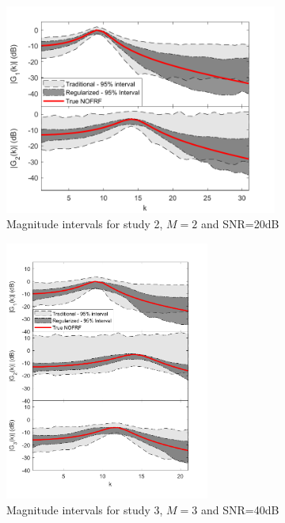 \begin{figure}[!hp]
\centering
\includegraphics[width=0.8\textwidth]{Chapter7_NOFRFs/Hamm2ndOrder_SNR10_N128_DiscreteTime.pdf}
\caption{Magnitude intervals for study 2, $M=2$ and SNR=20dB}
\label{fig:NOFRFs_2ndOrder_SNR10}
\end{figure}

\begin{figure}[!hp]
\centering
\includegraphics[width=0.6\textwidth]{Chapter7_NOFRFs/Hamm3rdOrder_SNR100_N128_DiscreteTime.pdf}
\caption{Magnitude intervals for study 3, $M=3$ and SNR=40dB}
\label{fig:NOFRFs_3rdOrder_SNR100}
\end{figure}

